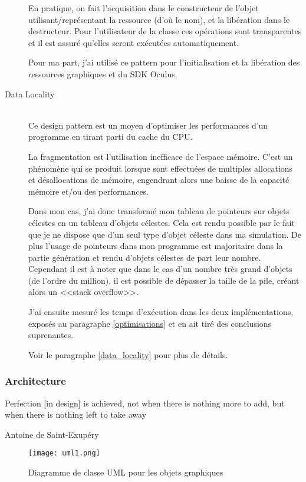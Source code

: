 \documentclass[a4paper,french,12pt]{article}
\begin{document}
\begin{description}
	      En pratique, on fait l'acquisition dans le constructeur de l'objet utilisant/représentant la ressource (d'où le nom), et
	      la libération dans le destructeur. Pour l'utilisateur de la classe ces opérations sont transparentes et il est
	      assuré qu'elles seront exécutées automatiquement.


	      Pour ma part, j'ai utilisé ce pattern pour l'initialisation et la libération des ressources graphiques et
	      du SDK Oculus.

	    \item [Data Locality]~\\

	      Ce design pattern est un moyen d'optimiser les performances d'un programme en tirant parti du cache du CPU.

	      La fragmentation est l'utilisation inefficace de l'espace mémoire. C'est un phénomène qui se produit lorsque
	      sont effectuées de multiples allocations et
	      désallocations de mémoire, engendrant alors une baisse de la capacité mémoire et/ou des performances.

	      Dans mon cas, j'ai donc transformé mon tableau de pointeurs sur objets célestes en un tableau d'objets célestes.
	      Cela est rendu possible par le fait que je ne dispose que d'un seul type d'objet céleste dans ma simulation.
	      De plus l'usage de pointeurs dans mon programme est majoritaire dans la partie génération et rendu d'objets célestes
	      de part leur nombre.
	      Cependant il est à noter que dans le cas d'un nombre très grand d'objets (de l'ordre du million), il est possible de dépasser
	      la taille de la pile, créant alors un <<stack overflow>>.

	      J'ai ensuite mesuré les temps d'exécution dans les deux implémentations, exposés au paragraphe \ref{optimisations}
	      et en ait tiré des conclusions suprenantes.

	      Voir le paragraphe \ref{data_locality} pour plus de détails.

	    \end{description}

	\subsubsection{Architecture}
	\epigraph{Perfection [in design] is achieved, not when there is nothing more to add, but when there is nothing left to take away}{Antoine de Saint-Exupéry}
	    \FloatBarrier
	    \begin{figure}
				  \centering
				  \texttt{[image: uml1.png]}
				  \caption{Diagramme de classe UML pour les objets graphiques}
	    \end{figure}
\end{document}
